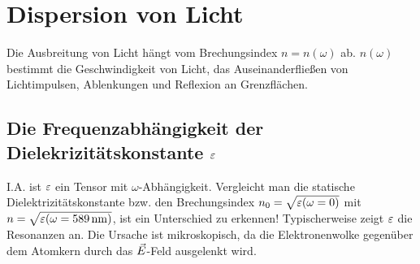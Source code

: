 



\chapter{Dispersion von Licht}
Die Ausbreitung von Licht hängt vom Brechungsindex $n=n(\omega)$
ab. $n(\omega)$ bestimmt die Geschwindigkeit von Licht, das
Auseinanderfließen von Lichtimpulsen, Ablenkungen und Reflexion an
Grenzflächen. 

\section{Die Frequenzabhängigkeit der Dielekrizitätskonstante $\varepsilon$}
I.A. ist $\varepsilon$ ein Tensor mit $\omega$-Abhängigkeit. Vergleicht man
die statische Dielektrizitätskonstante bzw. den Brechungsindex
$n_0=\sqrt{\varepsilon(\omega=0)}$ mit $
n=\sqrt{\varepsilon(\omega=\SI{589}{\nano\meter})}$, ist ein Unterschied zu erkennen! Typischerweise zeigt $\varepsilon$ die Resonanzen an. Die Ursache ist mikroskopisch, da die Elektronenwolke gegenüber dem Atomkern durch das $\vec{E}$-Feld ausgelenkt wird.
